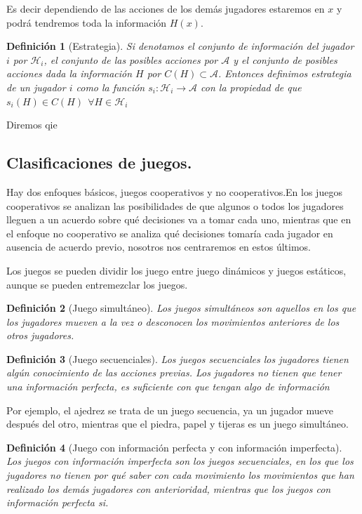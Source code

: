 \documentclass[a4paper]{report} %
\newtheorem{definicion}{Definición}[section]
\begin{document}
 Es decir dependiendo de las acciones de los demás jugadores estaremos en  $x$ y podrá tendremos toda la información $H(x)$. 

\begin{definicion}[Estrategia]
Si denotamos el conjunto de información del jugador $i$ por $\mathcal{H}_i$, el conjunto de las posibles acciones por $\mathcal{A} $ y el conjunto de posibles acciones dada la información $H$ por $ C(H) \subset \mathcal{A} $. Entonces definimos estrategia de un jugador $i$ como la función $s_i:\mathcal{H}_i\longrightarrow \mathcal{A}$ con la propiedad de que $s_i(H) \in C(H)~~ \forall H \in \mathcal{H}_i $
\end{definicion}

Diremos qie 

\subsection{Clasificaciones de juegos.}

Hay dos enfoques básicos, juegos cooperativos y no cooperativos.En los juegos cooperativos se analizan las posibilidades de que algunos o todos los jugadores lleguen a un acuerdo sobre qué decisiones va a tomar cada uno, mientras que en el enfoque no cooperativo se analiza qué decisiones tomaría cada jugador en ausencia de acuerdo previo, nosotros nos centraremos en estos últimos.

Los juegos se pueden dividir los juego entre juego dinámicos y juegos estáticos, aunque se pueden entremezclar los juegos.

\begin{definicion}[Juego simultáneo]
Los juegos simultáneos son aquellos en los que los jugadores 
mueven a la vez o desconocen los movimientos anteriores de los 
otros jugadores. 
\end{definicion}


\begin{definicion}[Juego secuenciales]
Los juegos secuenciales los jugadores tienen algún 
conocimiento de las acciones previas. Los jugadores no tienen que 
tener una información perfecta, es suficiente con que tengan algo 
de información
\end{definicion}

Por ejemplo, el ajedrez se trata de un juego secuencia, ya un jugador mueve después del otro, mientras que el piedra, papel y tijeras es un juego simultáneo.


\begin{definicion}[Juego con información perfecta y con información imperfecta]
Los juegos con información imperfecta son los juegos secuenciales, en los que los jugadores no tienen por qué saber  con cada movimiento los movimientos que han realizado los demás jugadores con anterioridad, mientras que los juegos con información perfecta si.
\end{definicion}
\end{document}

